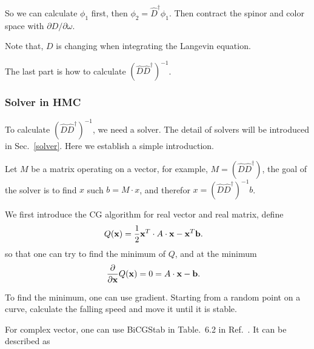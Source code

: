 So we can calculate $\phi _1$ first, then $\phi _2 = \hat{D}^{\dagger}\phi _1$. Then contract the spinor and color space with $\partial D / \partial \omega$.

Note that, $D$ is changing when integrating the Langevin equation.

The last part is how to calculate $(\hat{D}\hat{D}^{\dagger})^{-1}$.

\subsubsection{\label{Solver_In_HMC}Solver in HMC}

To calculate $(\hat{D}\hat{D}^{\dagger})^{-1}$, we need a solver. The detail of solvers will be introduced in Sec.~\ref{solver}. Here we establish a simple introduction.

Let $M$ be a matrix operating on a vector, for example, $M=(\hat{D}\hat{D}^{\dagger})$, the goal of the solver is to find $x$ such $b=M\cdot x$, and therefor $x=(\hat{D}\hat{D}^{\dagger})^{-1}b$.

We first introduce the CG algorithm for real vector and real matrix, define
\begin{equation}
\begin{split}
&Q({\bf x})=\frac{1}{2}{\bf x}^T \cdot A \cdot {\bf x}-{\bf x}^T {\bf b}.
\end{split}
\end{equation}
so that one can try to find the minimum of $Q$, and at the minimum
\begin{equation}
\begin{split}
&\frac{\partial }{\partial {\bf x}}Q({\bf x})=0=A\cdot {\bf x}-{\bf b}.
\end{split}
\end{equation}

To find the minimum, one can use gradient. Starting from a random point on a curve, calculate the falling speed and move it until it is stable.

For complex vector, one can use BiCGStab in Table.~6.2 in Ref.~\cite{latticeqcdbook2010}. It can be described as

